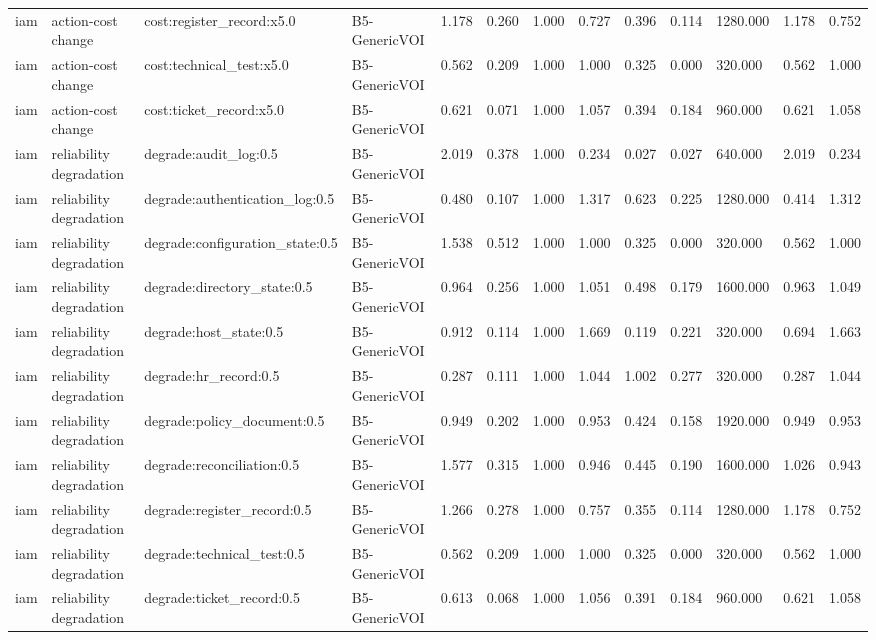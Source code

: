 \begin{table}[!ht]
{\begin{tabular}{lllllllllllll}
iam & action-cost change & cost:register\_record:x5.0 & B5-GenericVOI & 1.178 & 0.260 & 1.000 & 0.727 & 0.396 & 0.114 & 1280.000 & 1.178 & 0.752 \\
iam & action-cost change & cost:technical\_test:x5.0 & B5-GenericVOI & 0.562 & 0.209 & 1.000 & 1.000 & 0.325 & 0.000 & 320.000 & 0.562 & 1.000 \\
iam & action-cost change & cost:ticket\_record:x5.0 & B5-GenericVOI & 0.621 & 0.071 & 1.000 & 1.057 & 0.394 & 0.184 & 960.000 & 0.621 & 1.058 \\
iam & reliability degradation & degrade:audit\_log:0.5 & B5-GenericVOI & 2.019 & 0.378 & 1.000 & 0.234 & 0.027 & 0.027 & 640.000 & 2.019 & 0.234 \\
iam & reliability degradation & degrade:authentication\_log:0.5 & B5-GenericVOI & 0.480 & 0.107 & 1.000 & 1.317 & 0.623 & 0.225 & 1280.000 & 0.414 & 1.312 \\
iam & reliability degradation & degrade:configuration\_state:0.5 & B5-GenericVOI & 1.538 & 0.512 & 1.000 & 1.000 & 0.325 & 0.000 & 320.000 & 0.562 & 1.000 \\
iam & reliability degradation & degrade:directory\_state:0.5 & B5-GenericVOI & 0.964 & 0.256 & 1.000 & 1.051 & 0.498 & 0.179 & 1600.000 & 0.963 & 1.049 \\
iam & reliability degradation & degrade:host\_state:0.5 & B5-GenericVOI & 0.912 & 0.114 & 1.000 & 1.669 & 0.119 & 0.221 & 320.000 & 0.694 & 1.663 \\
iam & reliability degradation & degrade:hr\_record:0.5 & B5-GenericVOI & 0.287 & 0.111 & 1.000 & 1.044 & 1.002 & 0.277 & 320.000 & 0.287 & 1.044 \\
iam & reliability degradation & degrade:policy\_document:0.5 & B5-GenericVOI & 0.949 & 0.202 & 1.000 & 0.953 & 0.424 & 0.158 & 1920.000 & 0.949 & 0.953 \\
iam & reliability degradation & degrade:reconciliation:0.5 & B5-GenericVOI & 1.577 & 0.315 & 1.000 & 0.946 & 0.445 & 0.190 & 1600.000 & 1.026 & 0.943 \\
iam & reliability degradation & degrade:register\_record:0.5 & B5-GenericVOI & 1.266 & 0.278 & 1.000 & 0.757 & 0.355 & 0.114 & 1280.000 & 1.178 & 0.752 \\
iam & reliability degradation & degrade:technical\_test:0.5 & B5-GenericVOI & 0.562 & 0.209 & 1.000 & 1.000 & 0.325 & 0.000 & 320.000 & 0.562 & 1.000 \\
iam & reliability degradation & degrade:ticket\_record:0.5 & B5-GenericVOI & 0.613 & 0.068 & 1.000 & 1.056 & 0.391 & 0.184 & 960.000 & 0.621 & 1.058 \\

\end{tabular}}
\end{table}
